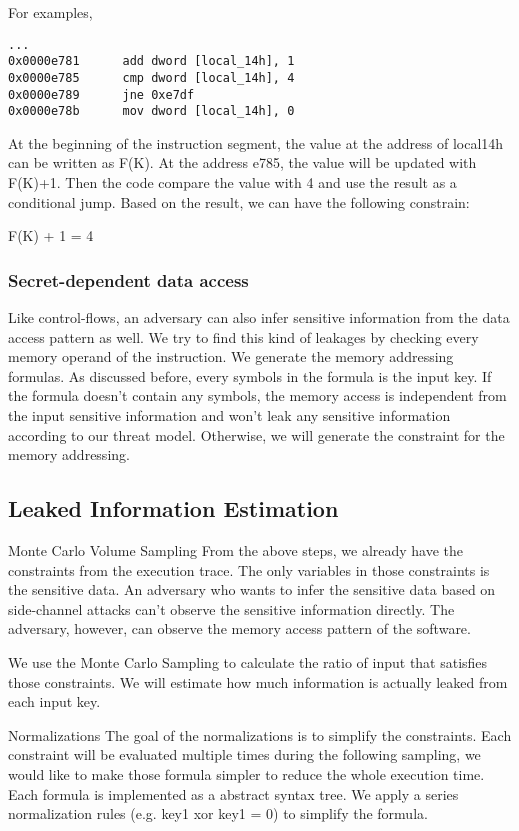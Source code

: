 For examples,

\begin{lstlisting}
...
0x0000e781      add dword [local_14h], 1
0x0000e785      cmp dword [local_14h], 4
0x0000e789      jne 0xe7df
0x0000e78b      mov dword [local_14h], 0

\end{lstlisting}

At the beginning of the instruction segment, the value at the 
address of local14h can be written as F(K). At the address e785, 
the value will be updated with F(K)+1. Then the code compare 
the value with 4 and use the result as a conditional jump. 
Based on the result, we can have the following constrain:

F(K) + 1 = 4

\subsubsection{Secret-dependent data access}
Like control-flows, an adversary can also infer sensitive information from the 
data access pattern as well. We try to find this kind of leakages by checking 
every memory operand of the instruction. We generate the memory addressing 
formulas. As discussed before, every symbols in the formula is the input key. 
If the formula doesn’t contain any symbols, the memory access is independent 
from the input sensitive information and won’t leak any sensitive information 
according to our threat model. Otherwise, we will generate the constraint for
the memory addressing.

\subsection{Leaked Information Estimation}
Monte Carlo Volume Sampling
From the above steps, we already have the constraints from the execution trace. 
The only variables in those constraints is the sensitive data. An adversary who 
wants to infer the sensitive data based on side-channel attacks can’t observe 
the sensitive information directly. The adversary, however, can observe the
memory access pattern of the software.  

We use the Monte Carlo Sampling to calculate the ratio of input that satisfies 
those constraints. We will estimate how much information is actually leaked 
from each input key.

Normalizations
The goal of the normalizations is to simplify the constraints. 
Each constraint will be evaluated multiple times during the following sampling, 
we would like to make those formula simpler to reduce the whole execution time.  
Each formula is implemented as a abstract syntax tree. We apply a series normalization
rules (e.g. key1 xor key1 = 0) to simplify the formula.



